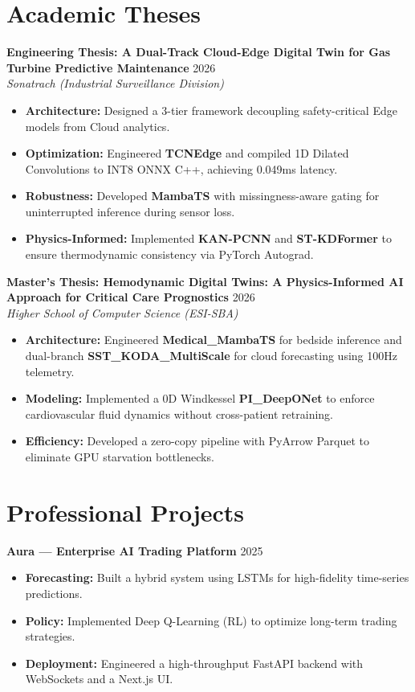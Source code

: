 \documentclass[a4paper,10pt]{article}
\begin{document}
\section{Academic Theses}
\noindent\textbf{Engineering Thesis: A Dual-Track Cloud-Edge Digital Twin for Gas Turbine Predictive Maintenance} \hfill 2026 \\
\textit{Sonatrach (Industrial Surveillance Division)}
\begin{itemize}
    \item \textbf{Architecture:} Designed a 3-tier framework decoupling safety-critical Edge models from Cloud analytics.
    \item \textbf{Optimization:} Engineered \textbf{TCNEdge} and compiled 1D Dilated Convolutions to INT8 ONNX C++, achieving 0.049ms latency.
    \item \textbf{Robustness:} Developed \textbf{MambaTS} with missingness-aware gating for uninterrupted inference during sensor loss.
    \item \textbf{Physics-Informed:} Implemented \textbf{KAN-PCNN} and \textbf{ST-KDFormer} to ensure thermodynamic consistency via PyTorch Autograd.
\end{itemize}

\noindent\textbf{Master's Thesis: Hemodynamic Digital Twins: A Physics-Informed AI Approach for Critical Care Prognostics} \hfill 2026 \\
\textit{Higher School of Computer Science (ESI-SBA)}
\begin{itemize}
    \item \textbf{Architecture:} Engineered \textbf{Medical\_MambaTS} for bedside inference and dual-branch \textbf{SST\_KODA\_MultiScale} for cloud forecasting using 100Hz telemetry.
    \item \textbf{Modeling:} Implemented a 0D Windkessel \textbf{PI\_DeepONet} to enforce cardiovascular fluid dynamics without cross-patient retraining.
    \item \textbf{Efficiency:} Developed a zero-copy pipeline with PyArrow Parquet to eliminate GPU starvation bottlenecks.
\end{itemize}

\section{Professional Projects}
\noindent\textbf{Aura --- Enterprise AI Trading Platform} \hfill 2025 \\
\begin{itemize}
    \item \textbf{Forecasting:} Built a hybrid system using LSTMs for high-fidelity time-series predictions.
    \item \textbf{Policy:} Implemented Deep Q-Learning (RL) to optimize long-term trading strategies.
    \item \textbf{Deployment:} Engineered a high-throughput FastAPI backend with WebSockets and a Next.js UI.
\end{itemize}
\end{document}
